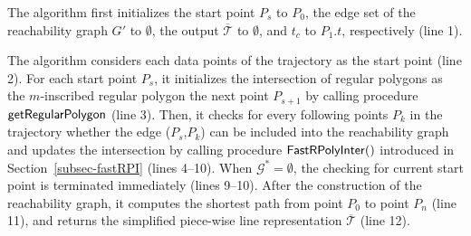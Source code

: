 The algorithm first initializes the start point $P_s$ to $P_0$, the edge set of
the reachability graph $G'$ to $\emptyset$, the output $\overline{\mathcal{T}}$ to $\emptyset$, and $t_c$ to $P_1.t$, respectively (line 1).
%

The algorithm considers each data points of the trajectory  as the
start point (line 2). For each start point $P_{s}$, it initializes
the intersection of regular polygons as the $m$-inscribed regular polygon \wrt the next point $P_{s+1}$  by calling
procedure ${\mathsf{getRegularPolygon}}$ (line 3).
Then, it checks for every following points $P_{k}$ in the trajectory whether the edge
($P_{s}$,$P_{k}$) can be included into the reachability graph and updates the
intersection by calling procedure ${\mathsf{FastRPolyInter}}()$ introduced in
Section~\ref{subsec-fastRPI} (lines 4--10).
When $\mathcal{G}^* = \emptyset$, the checking for current start point is terminated immediately (lines
9--10).
After the construction of the reachability graph, it computes the shortest path
from point $P_{0}$ to point $P_{n}$ (line 11), and returns the simplified  piece-wise line representation $\overline{\mathcal{T}}$ (line 12).


